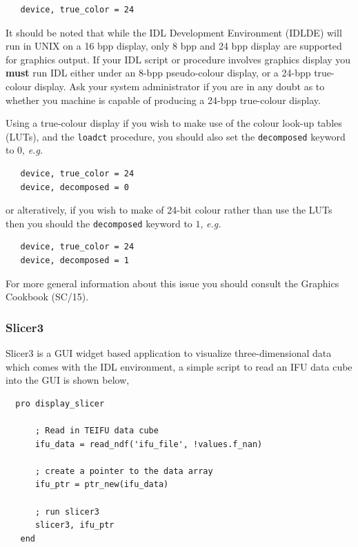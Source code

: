 \documentclass[twoside,11pt]{article}
\newcommand{\xref}[3]{#1}
\begin{document}
{\small\begin{verbatim}
   device, true_color = 24
\end{verbatim}\normalsize

It should be noted that while the IDL Development Environment (IDLDE)
will run in UNIX on a 16 bpp display, only 8 bpp and 24 bpp display
are supported for graphics output.  If your IDL script or procedure
involves graphics display you {\bf must} run IDL either under an 8-bpp
pseudo-colour display, or a 24-bpp true-colour display.  Ask your
system administrator if you are in any doubt as to whether you machine
is capable of producing a 24-bpp true-colour display.

Using a true-colour display if you wish to make use of the colour
look-up tables (LUTs), and the {\tt loadct} procedure, you should also
set the {\tt decomposed} keyword to $0$, \emph{e.g.}\

\small\begin{verbatim}
   device, true_color = 24
   device, decomposed = 0
\end{verbatim}\normalsize

or alteratively, if you wish to make of 24-bit colour rather than use
the LUTs then you should the {\tt decomposed} keyword to $1$,
\emph{e.g.}\

\small\begin{verbatim}
   device, true_color = 24
   device, decomposed = 1
\end{verbatim}\normalsize

For more general information about this issue you should consult the
\xref{Graphics Cookbook}{sc15}{sc15_display} (SC/15).

\subsubsection{Slicer3}

Slicer3 is a GUI widget based application to visualize
three-dimensional data which comes with the IDL environment, a simple
script to read an IFU data cube into the GUI is shown below,

\small\begin{verbatim}
  pro display_slicer
      
      ; Read in TEIFU data cube
      ifu_data = read_ndf('ifu_file', !values.f_nan)
      
      ; create a pointer to the data array
      ifu_ptr = ptr_new(ifu_data)
      
      ; run slicer3
      slicer3, ifu_ptr
   end
\end{verbatim}\normalsize

}
\end{document}
